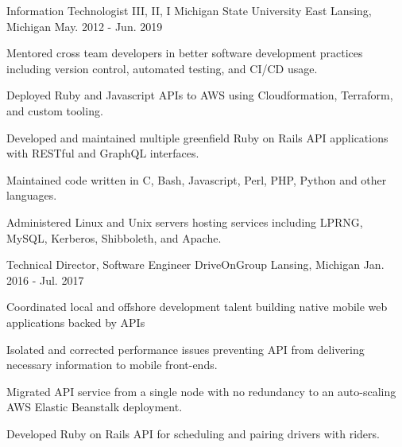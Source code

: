 \begin{cventries}
  \cventry
    {Information Technologist III, II, I} %
    {Michigan State University} %
    {East Lansing, Michigan} %
    {May. 2012 - Jun. 2019} %
    {
      \begin{cvitems} %
        \item {Mentored cross team developers in better software development practices including version control, automated testing, and CI/CD usage.}
        \item {Deployed Ruby and Javascript APIs to AWS using Cloudformation, Terraform, and custom tooling.}
        \item {Developed and maintained multiple greenfield Ruby on Rails API applications with RESTful and GraphQL interfaces.}
        \item {Maintained code written in C, Bash, Javascript, Perl, PHP, Python and other languages.}
        \item {Administered Linux and Unix servers hosting services including LPRNG, MySQL, Kerberos, Shibboleth, and Apache.}
      \end{cvitems}
    }

  \cventry
    {Technical Director, Software Engineer} %
    {DriveOnGroup} %
    {Lansing, Michigan} %
    {Jan. 2016 - Jul. 2017} %
    {
      \begin{cvitems} %
        \item {Coordinated local and offshore development talent building native mobile web applications backed by APIs}
        \item {Isolated and corrected performance issues preventing API from delivering necessary information to mobile front-ends.}
        \item {Migrated API service from a single node with no redundancy to an auto-scaling AWS Elastic Beanstalk deployment.}
        \item {Developed Ruby on Rails API for scheduling and pairing drivers with riders.}
      \end{cvitems}
    }


\end{cventries}
